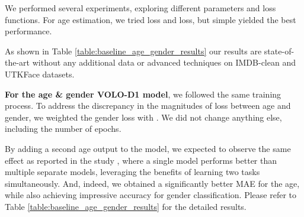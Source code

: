 We performed several experiments, exploring different parameters and loss functions. For age estimation, we tried  loss and  loss, but simple  yielded the best performance.

As shown in Table \ref{table:baseline_age_gender_results} our results are state-of-the-art without any additional data or advanced techniques on IMDB-clean and UTKFace datasets. 

\textbf{For the age \& gender VOLO-D1 model}, we followed the same training process. To address the discrepancy in the magnitudes of loss between age and gender, we weighted the gender loss with . We did not change anything else, including the number of epochs.

By adding a second age output to the model, we expected to observe the same effect as reported in the study \cite{multitask_kendall}, where a single model performs better than multiple separate models, leveraging the benefits of learning two tasks simultaneously. And, indeed, we obtained a significantly better MAE for the age, while also achieving impressive accuracy for gender classification. Please refer to Table \ref{table:baseline_age_gender_results} for the detailed results.


